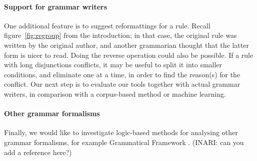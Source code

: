 
\paragraph{Support for grammar writers}
One additional feature is to suggest reformattings for a rule. Recall
figure~\ref{fig:regroup} from the introduction; in that case, the
original rule was written by the original author, and another
grammarian thought that the latter form is nicer to read. Doing the
reverse operation could also be possible. If a rule with long
disjunctions conflicts, it may be useful to split it into smaller
conditions, and eliminate one at a time, in order to find the
reason(s) for the conflict.
Our next step is to evaluate our tools together with actual grammar writers,
in comparison with a corpus-based method or machine learning.

\paragraph{Other grammar formalisms}
Finally, we would like to investigate logic-based methods for analysing other grammar
formalisms, for example Grammatical Framework \cite{gf}. (INARI: can you add a reference here?)




